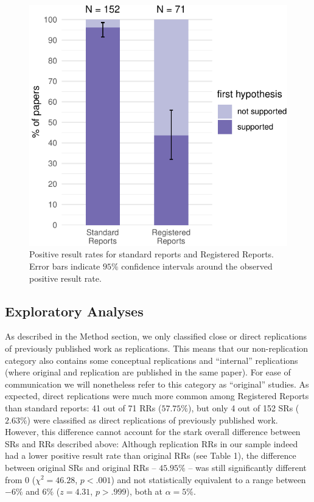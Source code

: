 \documentclass[british,,man,floatsintext]{apa6}
\begin{document}
\begin{figure}
\centering
\includegraphics{manuscript_files/figure-latex/mainplot-1.pdf}
\caption{\label{fig:mainplot}Positive result rates for standard reports and Registered Reports. Error bars indicate \(95 \%\) confidence intervals around the observed positive result rate.}
\end{figure}

\hypertarget{exploratory-analyses}{%
\subsection{Exploratory Analyses}\label{exploratory-analyses}}

As described in the Method section, we only classified close or direct replications of previously published work as replications.
This means that our non-replication category also contains some conceptual replications and \enquote{internal} replications (where original and replication are published in the same paper).
For ease of communication we will nonetheless refer to this category as \enquote{original} studies.
As expected, direct replications were much more common among Registered Reports than standard reports: 41 out of 71 RRs (\(57.75\%\)), but only 4 out of 152 SRs (\(2.63\%\)) were classified as direct replications of previously published work.
However, this difference cannot account for the stark overall difference between SRs and RRs described above:
Although replication RRs in our sample indeed had a lower positive result rate than original RRs (see Table 1), the difference between original SRs and original RRs -- \(45.95\%\) -- was still significantly different from 0 (\(\chi^2 = 46.28\), \(p < .001\)) and not statistically equivalent to a range between \(-6\%\) and \(6\%\) (\(z = 4.31\), \(p > .999\)), both at \(\alpha = 5\%\).
\end{document}
